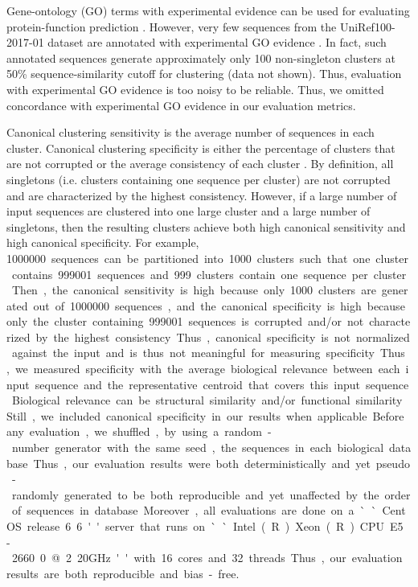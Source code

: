 \documentclass[11pt,letterpaper]{article}
\begin{document}
Gene-ontology (GO) terms with experimental evidence can be used for evaluating protein-function prediction \citep{radivojac2013large}.
However, very few sequences from the UniRef100-2017-01 dataset are annotated with experimental GO evidence \citep{suzek2014uniref}.
In fact, such annotated sequences generate approximately only 100 non-singleton clusters at 50\% sequence-similarity cutoff for clustering (data not shown).
Thus, evaluation with experimental GO evidence is too noisy to be reliable.
Thus, we omitted concordance with experimental GO evidence in our evaluation metrics.

Canonical clustering sensitivity is the average number of sequences in each cluster.
Canonical clustering specificity is either the percentage of clusters that are not corrupted \citep{hauser2013kclust} or the average consistency of each cluster \citep{hauser2016mmseqs,steinegger2017mmseqs2,steinegger2017linclust}.
By definition, all singletons (i.e. clusters containing one sequence per cluster) are not corrupted and are characterized by the highest consistency.
However, if a large number of input sequences are clustered into one large cluster and a large number of singletons, then the resulting clusters achieve both high canonical sensitivity and high canonical specificity.
For example, \SI{1000000} sequences can be partitioned into \SI{1000} clusters such that one cluster contains \SI{999001} sequences and \SI{999} clusters contain one sequence per cluster.
Then, 
	the canonical sensitivity is high because only \SI{1000} clusters are generated out of \SI{1000000} sequences, 
	and the canonical specificity is high because only the cluster containing \SI{999001} sequences is corrupted and/or not characterized by the highest consistency.
Thus, canonical specificity is not normalized against the input and is thus not meaningful for measuring specificity.
Thus, we measured specificity with the average biological relevance between each input sequence and the representative centroid that covers this input sequence.
Biological relevance can be structural similarity and/or functional similarity.  
Still, we included canonical specificity in our results when applicable.

Before any evaluation, we shuffled, by using a random-number generator with the same seed, the sequences in each biological database.
Thus, our evaluation results were both deterministically and yet pseudo-randomly generated to be both reproducible and yet unaffected by the order of sequences in database.
Moreover, all evaluations are done on a ``CentOS release 6.6'' server that runs on ``Intel(R) Xeon(R) CPU E5-2660 0 @ 2.20GHz'' with 16 cores and 32 threads.
Thus, our evaluation results are both reproducible and bias-free.
\end{document}

